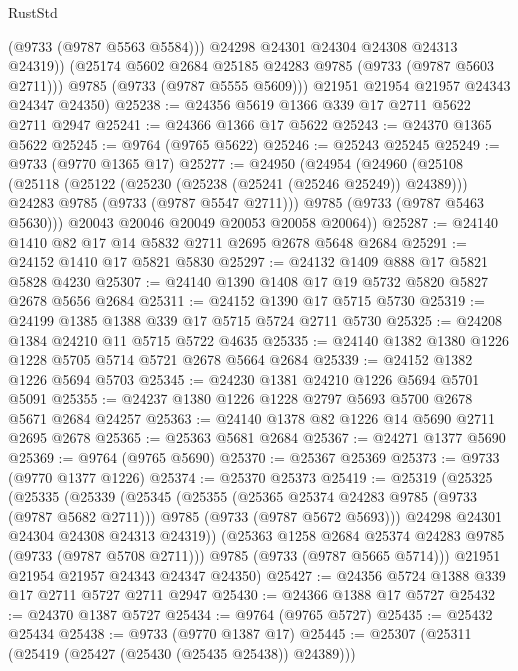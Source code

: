 \begin{lexlean}{RustStd}
\begin{coremodule}
              (@9733 (@9787 @5563 @5584)))
            @24298
            @24301
            @24304
            @24308
            @24313
            @24319))
        (@25174 @5602 @2684 @25185 @24283 @9785 (@9733 (@9787 @5603 @2711)))
        @9785
        (@9733 (@9787 @5555 @5609)))
      @21951
      @21954
      @21957
      @24343
      @24347
      @24350)
@25238 := @24356 @5619 @1366 @339 @17 @2711 @5622 @2711 @2947
@25241 := @24366 @1366 @17 @5622
@25243 := @24370 @1365 @5622
@25245 := @9764 (@9765 @5622)
@25246 := @25243 @25245
@25249 := @9733 (@9770 @1365 @17)
@25277 := @24950
    (@24954
      (@24960
        (@25108
          (@25118
            (@25122 (@25230 (@25238 (@25241 (@25246 @25249)) @24389)))
            @24283
            @9785
            (@9733 (@9787 @5547 @2711)))
          @9785
          (@9733 (@9787 @5463 @5630)))
        @20043
        @20046
        @20049
        @20053
        @20058
        @20064))
@25287 := @24140 @1410 @82 @17 @14 @5832 @2711 @2695 @2678 @5648 @2684
@25291 := @24152 @1410 @17 @5821 @5830
@25297 := @24132 @1409 @888 @17 @5821 @5828 @4230
@25307 := @24140 @1390 @1408 @17 @19 @5732 @5820 @5827 @2678 @5656 @2684
@25311 := @24152 @1390 @17 @5715 @5730
@25319 := @24199 @1385 @1388 @339 @17 @5715 @5724 @2711 @5730
@25325 := @24208 @1384 @24210 @11 @5715 @5722 @4635
@25335 := @24140 @1382 @1380 @1226 @1228 @5705 @5714 @5721 @2678 @5664 @2684
@25339 := @24152 @1382 @1226 @5694 @5703
@25345 := @24230 @1381 @24210 @1226 @5694 @5701 @5091
@25355 := @24237 @1380 @1226 @1228 @2797 @5693 @5700 @2678 @5671 @2684 @24257
@25363 := @24140 @1378 @82 @1226 @14 @5690 @2711 @2695 @2678
@25365 := @25363 @5681 @2684
@25367 := @24271 @1377 @5690
@25369 := @9764 (@9765 @5690)
@25370 := @25367 @25369
@25373 := @9733 (@9770 @1377 @1226)
@25374 := @25370 @25373
@25419 := @25319
    (@25325
      (@25335
        (@25339
          (@25345
            (@25355
              (@25365 @25374 @24283 @9785 (@9733 (@9787 @5682 @2711)))
              @9785
              (@9733 (@9787 @5672 @5693)))
            @24298
            @24301
            @24304
            @24308
            @24313
            @24319))
        (@25363 @1258 @2684 @25374 @24283 @9785 (@9733 (@9787 @5708 @2711)))
        @9785
        (@9733 (@9787 @5665 @5714)))
      @21951
      @21954
      @21957
      @24343
      @24347
      @24350)
@25427 := @24356 @5724 @1388 @339 @17 @2711 @5727 @2711 @2947
@25430 := @24366 @1388 @17 @5727
@25432 := @24370 @1387 @5727
@25434 := @9764 (@9765 @5727)
@25435 := @25432 @25434
@25438 := @9733 (@9770 @1387 @17)
@25445 := @25307 (@25311 (@25419 (@25427 (@25430 (@25435 @25438)) @24389)))

\end{coremodule}
\end{lexlean}
